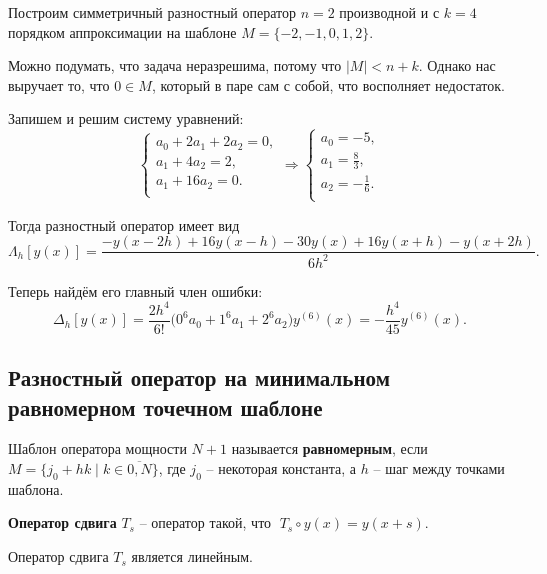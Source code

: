 \documentclass[../main.tex]{subfile}
\begin{document}
\begin{example}\label{eq:central_do_example}
	Построим симметричный разностный оператор $n=2$ производной и с $k=4$
	порядком аппроксимации на шаблоне $M=\{-2,-1,0,1,2\}$.

	Можно подумать, что задача неразрешима, потому что $|M|<n+k$. Однако
	нас выручает то, что $0\in M$, который в паре сам с собой, что
	восполняет недостаток.

	Запишем и решим систему уравнений:
	\begin{equation*}
		\begin{cases}
			a_0 + 2a_1 + 2a_2 = 0, \\
			a_1 + 4a_2 = 2, \\
			a_1 + 16a_2 = 0. \\
		\end{cases}
		\Rightarrow
		\begin{cases}
			a_0 = -5, \\
			a_1 = \frac{8}{3}, \\
			a_2 = -\frac{1}{6}.\\
		\end{cases}
	\end{equation*}

	Тогда разностный оператор имеет вид
	\[\Lambda_h[y(x)]=\frac{-y(x-2h)+16y(x-h)-30y(x)+16y(x+h)-y(x+2h)}
	{6h^2}.\]

	Теперь найдём его главный член ошибки:
	\[\Delta_h[y(x)]=\frac{2h^4}{6!}\big(0^6a_0+1^6a_1+2^6a_2\big)y^{(6)}
	(x)=-\frac{h^4}{45}y^{(6)}(x).\]
\end{example}
\newpage

\subsection{Разностный оператор на минимальном равномерном точечном шаблоне}

\begin{define}
	Шаблон оператора мощности $N+1$ называется \textbf{равномерным}, если \\
	$M=\{j_0+hk\mid k\in\overline{0,N}\}$, где $j_0$ -- некоторая константа,
	а $h$ -- шаг между точками шаблона.
\end{define}

\begin{define}
	\textbf{Оператор сдвига} $T_s$ -- оператор такой, что
	$\; T_s\circ y(x)=y(x+s)$.
\end{define}

\begin{lemma}
	Оператор сдвига $T_s$ является линейным.
\end{lemma}
\end{document}
